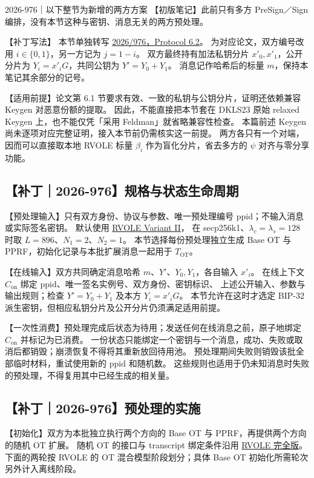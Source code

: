 \begin{patchnote}{2026-976｜以下整节为新增的两方方案}
【初版笔记】此前只有多方 PreSign／Sign 编排，没有本节这种与密钥、消息无关的两方预处理。

【补丁写法】
本节单独转写 \href{https://eprint.iacr.org/2026/976.pdf}{2026/976，Protocol 6.2}。
为对应论文，双方编号改用 $i\in\{0,1\}$，另一方记为 $j=1-i$。
双方最终持有加法私钥分片 $x'_0,x'_1$，公开分片为 $Y_i=x'_iG$，共同公钥为 $Y'=Y_0+Y_1$。
消息记作哈希后的标量 $m$，保持本笔记其余部分的记号。

【适用前提】论文第 6.1 节要求有效、一致的私钥与公钥分片，证明还依赖兼容 Keygen 对恶意份额的提取。
因此，不能直接把本节套在 DKLS23 原始 relaxed Keygen 上，也不能仅凭「采用 Feldman」就省略兼容性检查。
本篇前述 Keygen 尚未逐项对应完整证明，接入本节前仍需核实这一前提。
两方各只有一个对端，因而可以直接取本地 RVOLE 标量 $\beta_i$ 作为盲化分片，省去多方的 $\psi$ 对齐与零分享功能。

\subsection{【补丁｜2026-976】规格与状态生命周期}

【预处理输入】只有双方身份、协议与参数、唯一预处理编号 $\mathrm{ppid}$；不输入消息或实际签名密钥。
默认使用 \hyperref[sec:rvole:variants]{RVOLE Variant II}，
在 secp256k1、$\lambda_c=\lambda_s=128$ 时取 $L=896$、$N_1=2$、$N_2=1$。
本节选择每份预处理独立生成 Base OT 与 PPRF，初始化记录与本批扩展消息一起用于 $T_{\mathrm{OT}}$。

【在线输入】双方共同确定消息哈希 $m$、$Y'$、$Y_0,Y_1$，各自输入 $x'_i$。
在线上下文 $C_{\mathrm{on}}$ 绑定 $\mathrm{ppid}$、唯一签名实例号、双方身份、密钥标识、
上述公开输入、参数与输出规则；检查 $Y'=Y_0+Y_1$ 及本方 $Y_i=x'_iG$。
本节允许在这时才选定 BIP-32 派生密钥，但相应私钥分片及公开分片仍须满足适用前提。

【一次性消费】预处理完成后状态为待用；发送任何在线消息之前，原子地绑定 $C_{\mathrm{on}}$ 并标记为已消费。
一份状态只能绑定一个密钥与一个消息，成功、失败或取消后都销毁；崩溃恢复不得将其重新放回待用池。
预处理期间失败则销毁该批全部临时材料，重试使用新的 $\mathrm{ppid}$ 和随机数。
这些规则也适用于仍未知消息时失败的预处理，不得复用其中已经生成的相关量。

\subsection{【补丁｜2026-976】预处理的实施}

【初始化】双方为本批独立执行两个方向的 Base OT 与 PPRF，再提供两个方向的随机 OT 扩展。
随机 OT 的接口与 transcript 绑定条件沿用 \hyperref[sec:rvole:parameters-model]{RVOLE 完全版}。
下面的两轮按 RVOLE 的 OT 混合模型阶段划分；具体 Base OT 初始化所需轮次另外计入离线阶段。


\end{patchnote}
